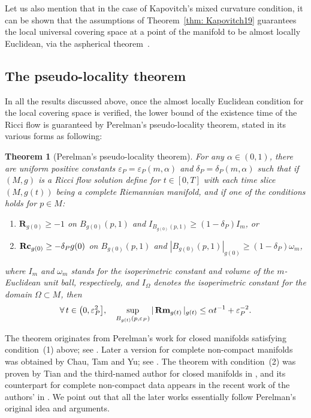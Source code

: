 \documentclass[10pt,a4paper]{amsart}
\numberwithin{equation}{section}
\newtheorem{Theorem}{Theorem}[section]
\newcommand{\Rm}{\operatorname{\bf Rm}}
\newcommand{\Rc}{\operatorname{\bf Rc}}
\newcommand{\Sc}{\mathbf{R}}
\begin{document}
Let us also mention that in the case of Kapovitch's mixed curvature condition,
it can be shown that the assumptions of Theorem~\ref{thm: Kapovitch19}
guarantees the local universal covering space at a point of the manifold to be
 almost locally Euclidean, via the aspherical theorem~\cite[Theorem~5.3]{Kapovitch19}.

\subsection{The pseudo-locality theorem}\label{section4.2}
In all the results discussed above, once the almost locally Euclidean condition
for the local covering space is verified, the lower bound of the existence time
of the Ricci flow is guaranteed by Perelman's pseudo-locality theorem, stated
in its various forms as following:
\begin{Theorem}[Perelman's pseudo-locality theorem]
For any $\alpha\in (0,1)$, there are uniform positive constants
$\varepsilon_P=\varepsilon_P(m,\alpha)$ and $\delta_P=\delta_P(m,\alpha)$
such that if $(M,g)$ is a Ricci flow solution define for $t\in [0,T]$ with each
time slice $(M,g(t))$ being a complete Riemannian manifold, and if one of the
conditions holds for $p\in M$:
\begin{enumerate}\itemsep=0pt
 \item[$1)$] $\Sc_{g(0)}\ge -1$ on $B_{g(0)}(p,1)$ and $I_{B_{g(0)}(p,1)}\ge
 (1-\delta_P)I_m$, or
 \item[$2)$] $\Rc_{g(0)}\ge -\delta_P g(0)$ on $B_{g(0)}(p,1)$ and
 $|B_{g(0)}(p,1)|_{g(0)}\ge (1-\delta_P)\omega_m$,
\end{enumerate}
where $I_m$ and $\omega_m$ stands for the isoperimetric constant and volume of
the $m$-Euclidean unit ball, respectively, and $I_{\Omega}$ denotes the
isoperimetric constant for the domain $\Omega\subset M$, then
\begin{align}\label{eqn: pseudolocality_Rm}
\forall\, t\in \big(0,\varepsilon_P^2\big],\quad
\sup_{B_{g(t)}(p,\varepsilon_P)} |\Rm_{g(t)} |_{g(t)} \le \alpha
t^{-1} +\varepsilon_P^{-2}.
\end{align}
\end{Theorem}
The theorem originates from Perelman's work for closed manifolds satisfying
condition~(1) above; see \cite[Theorem 10.1]{Perelman}. Later a version for
complete non-compact manifolds was obtained by Chau, Tam and Yu; see
\cite[Theorem~8.1]{CTY11}. The theorem with condition~(2) was proven by Tian
and the third-named author for closed manifolds in \cite[Proposition~3.1]{TW15}, and its counterpart for complete non-compact data appears in
the recent work of the authors' in \cite[Proposition~6.1]{HW20a}. We point out
that all the later works essentially follow Perelman's original idea and
arguments.
\end{document}
